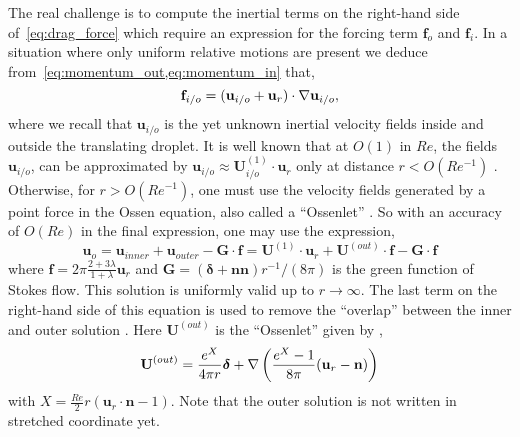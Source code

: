 The real challenge is to compute the inertial terms on the right-hand side of~\ref{eq:drag_force} which require an expression for the forcing term $\textbf{f}_o$ and $\textbf{f}_i$. 
In a situation where only uniform relative motions are present we deduce from~\ref{eq:momentum_out,eq:momentum_in} that, 
\begin{equation}
    \textbf{f}_{i/o} = 
    (\textbf{u}_{i/o} + \textbf{u}_r)\cdot \grad \textbf{u}_{i/o},
    \label{eq:inertial_term}
\end{equation}
where we recall that $\textbf{u}_{i/o}$ is the yet unknown inertial velocity fields inside and outside the translating droplet. 
It is well known that at $O(1)$ in $Re$, the fields $\textbf{u}_{i/o}$, can be approximated by $\textbf{u}_{i/o} \approx \textbf{U}^{(1)}_{i/o}\cdot \textbf{u}_r$ only at distance $r < O(Re^{-1})$ \citet{proudman1957expansions}. 
Otherwise, for $r > O(Re^{-1})$, one must use the velocity fields generated by a point force in the Ossen equation, also called a ``Ossenlet'' \citep{pozrikidis2011introduction}. 
So with an accuracy of $O(Re)$ in the final expression, one may use the expression, 
\begin{equation}
    \textbf{u}_{o} = 
    \textbf{u}_{inner}
    + \textbf{u}_{outer}
    - \textbf{G}\cdot \textbf{f}
    =
    \textbf{U}^{(1)}\cdot \textbf{u}_r
    + \textbf{U}^{(out)}\cdot \textbf{f}
    - \textbf{G}\cdot \textbf{f}
    \label{eq:order_1_vel}
\end{equation}
where $\textbf{f}= 2\pi \frac{2+3\lambda}{1+\lambda} \textbf{u}_r$ and $\textbf{G}=(\bm\delta+\textbf{nn})r^{-1}/(8\pi)$ is the green function of Stokes flow. 
This solution is uniformly valid up to $r \to\infty$.
The last term on the right-hand side of this equation is used to remove the ``overlap'' between the inner and outer solution \citet{stone2001inertial}. 
Here $\textbf{U}^{(out)}$ is the ``Ossenlet'' given by \citep{pozrikidis2011introduction}, 
\begin{equation}
    \textbf{U}^{(out)}
    = \frac{e^X}{4\pi r}\bm\delta
    + \mathbf{\nabla} \left(
        \frac{e^X-1}{8\pi}
        (\textbf{u}_r - \textbf{n})
    \right)
\end{equation}
with $X = \frac{Re}{2} r (\textbf{u}_r \cdot \textbf{n} - 1)$. 
Note that the outer solution is not written in stretched coordinate yet. 


